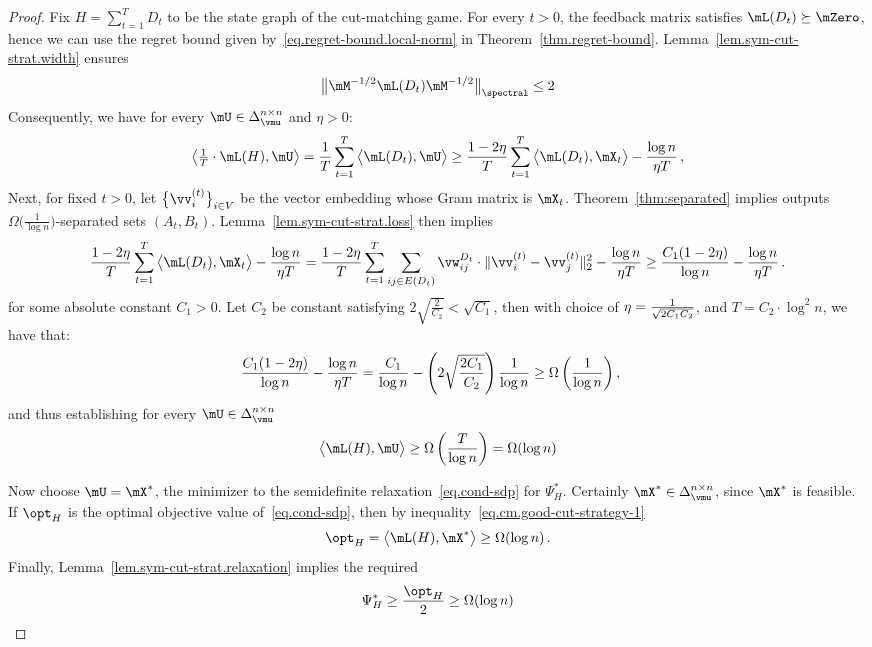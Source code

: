 \documentclass[letterpaper]{article}
\begin{document}
\begin{proof}
Fix $H = \sum_{t=1}^T D_t$ to be the state graph of the cut-matching game. For every $t > 0$, the feedback matrix satisfies $\mL(D_t) \succeq \mZero$, hence we can use the regret bound given by~\eqref{eq.regret-bound.local-norm} in Theorem~\ref{thm.regret-bound}. Lemma~\ref{lem.sym-cut-strat.width} ensures
\begin{equation*}
\big\lVert \mM^{-1/2} \mL(D_t) \mM^{-1/2} \big\rVert_{\spectral} \leq 2
\end{equation*}
Consequently, we have for every $\mU \in \Delta_{\vmu}^{n \times n}$ and $\eta > 0$:
\begin{equation*}
\big\langle \tfrac{1}{T} \cdot \mL(H), \mU \big\rangle
= \frac{1}{T} \sum_{t=1}^T \big\langle \mL(D_t), \mU \big\rangle
\geq \frac{1 - 2\eta}{T} \sum_{t=1}^T \big\langle \mL(D_t), \mX_t \big\rangle - \frac{\log n}{\eta T} \, ,
\end{equation*}
Next, for fixed $t > 0$, let $\big\{ \vv_i^{(t)} \big\}_{i \in V}$ be the vector embedding whose Gram matrix is $\mX_t$. Theorem~\ref{thm:separated} implies \roundcut outputs $\Omega\big( \frac{1}{\log n} \big)$-separated sets $(A_t, B_t)$. Lemma~\ref{lem.sym-cut-strat.loss} then implies
\begin{equation*}
\frac{1 - 2\eta}{T} \sum_{t=1}^T \big\langle \mL(D_t), \mX_t \big\rangle - \frac{\log n}{\eta T}
= \frac{1 - 2\eta}{T} \sum_{t=1}^T \sum_{ij\in E(D_t)}\vw_{ij}^{D_t} \cdot \lVert \vv^{(t)}_i - \vv^{(t)}_j \rVert^{2}_2 - \frac{\log n}{\eta T}
\geq \frac{C_1(1 - 2\eta)}{\log n}  - \frac{\log n}{\eta T} \, .
\end{equation*}
for some absolute constant $C_1 > 0$. Let $C_2$ be constant satisfying $2\sqrt{\frac{2}{C_2}} < \sqrt{C_1}$, then with choice of $\eta = {1\over \sqrt{2 C_1 C_2}}$, and $T = C_2 \cdot {\log^2 n }$, we have that:
\begin{align*}
\frac{C_1(1 - 2\eta)}{\log n} - \frac{\log n}{\eta T}
&={ C_1 \over \log n}- \left(2\sqrt{2 C_1 \over C_2}\right){1 \over \log n} \geq \Omega\left({1 \over \log n}\right),
\end{align*}
and thus establishing for every $\mU \in \Delta_{\vmu}^{n \times n}$
\begin{equation}
\label{eq.cm.good-cut-strategy-1}
\big\langle \mL(H), \mU \big\rangle
\geq \Omega \left({T \over \log n}\right)
= \Omega(\log n)
\end{equation}

Now choose $\mU = \mX^*$, the minimizer to the semidefinite relaxation~\eqref{eq.cond-sdp} for $\Psi_H^*$. Certainly $\mX^* \in \Delta_{\vmu}^{n \times n}$, since $\mX^*$ is feasible. If $\opt_H$ is the optimal objective value of~\eqref{eq.cond-sdp}, then by inequality~\eqref{eq.cm.good-cut-strategy-1}
\begin{equation*}
\opt_H
= \big\langle \mL(H), \mX^* \big\rangle
\geq \Omega(\log n) \, .
\end{equation*}
Finally, Lemma~\ref{lem.sym-cut-strat.relaxation} implies the required
\begin{equation*}
\Psi_H^*
\geq \frac{\opt_H}{2}
\geq \Omega(\log n)
\end{equation*}


\end{proof}
\end{document}
